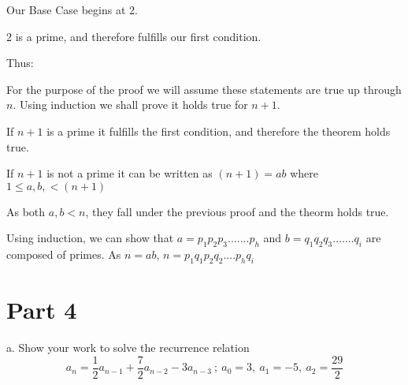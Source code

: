\documentclass{article}
\begin{document}
Our Base Case begins at 2.

2 is a prime, and therefore fulfills our first condition.\vspace{0.2in}

Thus:

For the purpose of the proof we will assume these statements are true up through $n$. Using induction we shall prove it holds true for $n+1$.

If $n+1$ is a prime it fulfills the first condition, and therefore the theorem holds true.

If $n+1$ is not a prime it can be written as $(n+1) = ab$ where $1 \leq a, b, < (n+1)$

As both $a, b < n$, they fall under the previous proof and the theorm holds true.

Using induction, we can show that
$a = p_1p_2p_3.......p_h$
and
$b = q_1q_2q_3.......q_i$ are composed of primes. As $n = ab$,  $n = p_1q_1p_2q_2....p_hq_i$\vspace{0.5in}
\newpage
\section{Part 4}

a. Show your work to solve the recurrence relation $$a_n= \frac{1}{2}a_{n-1}+\frac{7}{2}a_{n-2}-3a_{n-3}\ ; \ a_0=3,\ a_1=-5,\ a_2=\frac{29}{2}$$\\
\end{document}
